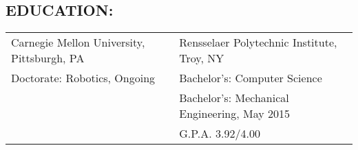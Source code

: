 \documentclass[margin]{res}
\begin{document}

\address{\bf Permanent\\ 3361 E. Maplewood Ave. \\   Centennial, CO 80121\\ {\bf phone: }(720) 270-3901 \\ {\bf email: }micahcorah@gmail.com}
\address{\bf Current\\ 510 N. Negley Ave. \\ Apt. 2 \\   Pittsburgh, PA 15206  }

\begin{resume}
  \section{EDUCATION:}
  \begin{tabular}{ll}
    Carnegie Mellon University, Pittsburgh, PA & Rensselaer Polytechnic Institute, Troy, NY \\
    Doctorate: Robotics, Ongoing & Bachelor's: Computer Science \\
                                 &Bachelor's: Mechanical Engineering, May 2015 \\
                                 &G.P.A. 3.92/4.00
  \end{tabular}


\end{resume}
\end{document}
